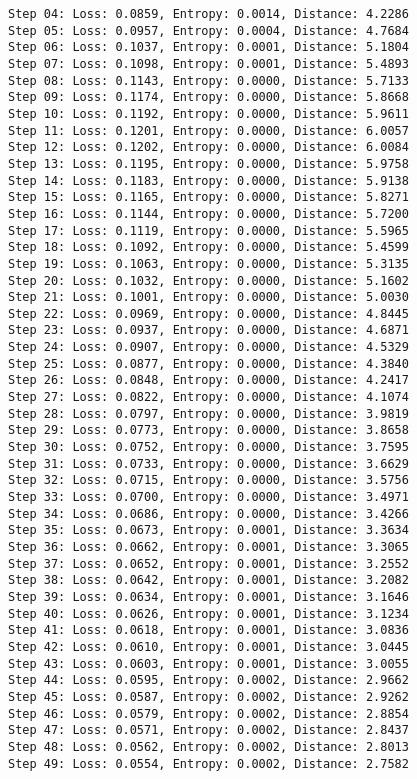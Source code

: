 \documentclass[11pt]{article}
\begin{document}
\begin{Verbatim}[commandchars=\\\{\}]
Step 04: Loss: 0.0859, Entropy: 0.0014, Distance: 4.2286
Step 05: Loss: 0.0957, Entropy: 0.0004, Distance: 4.7684
Step 06: Loss: 0.1037, Entropy: 0.0001, Distance: 5.1804
Step 07: Loss: 0.1098, Entropy: 0.0001, Distance: 5.4893
Step 08: Loss: 0.1143, Entropy: 0.0000, Distance: 5.7133
Step 09: Loss: 0.1174, Entropy: 0.0000, Distance: 5.8668
Step 10: Loss: 0.1192, Entropy: 0.0000, Distance: 5.9611
Step 11: Loss: 0.1201, Entropy: 0.0000, Distance: 6.0057
Step 12: Loss: 0.1202, Entropy: 0.0000, Distance: 6.0084
Step 13: Loss: 0.1195, Entropy: 0.0000, Distance: 5.9758
Step 14: Loss: 0.1183, Entropy: 0.0000, Distance: 5.9138
Step 15: Loss: 0.1165, Entropy: 0.0000, Distance: 5.8271
Step 16: Loss: 0.1144, Entropy: 0.0000, Distance: 5.7200
Step 17: Loss: 0.1119, Entropy: 0.0000, Distance: 5.5965
Step 18: Loss: 0.1092, Entropy: 0.0000, Distance: 5.4599
Step 19: Loss: 0.1063, Entropy: 0.0000, Distance: 5.3135
Step 20: Loss: 0.1032, Entropy: 0.0000, Distance: 5.1602
Step 21: Loss: 0.1001, Entropy: 0.0000, Distance: 5.0030
Step 22: Loss: 0.0969, Entropy: 0.0000, Distance: 4.8445
Step 23: Loss: 0.0937, Entropy: 0.0000, Distance: 4.6871
Step 24: Loss: 0.0907, Entropy: 0.0000, Distance: 4.5329
Step 25: Loss: 0.0877, Entropy: 0.0000, Distance: 4.3840
Step 26: Loss: 0.0848, Entropy: 0.0000, Distance: 4.2417
Step 27: Loss: 0.0822, Entropy: 0.0000, Distance: 4.1074
Step 28: Loss: 0.0797, Entropy: 0.0000, Distance: 3.9819
Step 29: Loss: 0.0773, Entropy: 0.0000, Distance: 3.8658
Step 30: Loss: 0.0752, Entropy: 0.0000, Distance: 3.7595
Step 31: Loss: 0.0733, Entropy: 0.0000, Distance: 3.6629
Step 32: Loss: 0.0715, Entropy: 0.0000, Distance: 3.5756
Step 33: Loss: 0.0700, Entropy: 0.0000, Distance: 3.4971
Step 34: Loss: 0.0686, Entropy: 0.0000, Distance: 3.4266
Step 35: Loss: 0.0673, Entropy: 0.0001, Distance: 3.3634
Step 36: Loss: 0.0662, Entropy: 0.0001, Distance: 3.3065
Step 37: Loss: 0.0652, Entropy: 0.0001, Distance: 3.2552
Step 38: Loss: 0.0642, Entropy: 0.0001, Distance: 3.2082
Step 39: Loss: 0.0634, Entropy: 0.0001, Distance: 3.1646
Step 40: Loss: 0.0626, Entropy: 0.0001, Distance: 3.1234
Step 41: Loss: 0.0618, Entropy: 0.0001, Distance: 3.0836
Step 42: Loss: 0.0610, Entropy: 0.0001, Distance: 3.0445
Step 43: Loss: 0.0603, Entropy: 0.0001, Distance: 3.0055
Step 44: Loss: 0.0595, Entropy: 0.0002, Distance: 2.9662
Step 45: Loss: 0.0587, Entropy: 0.0002, Distance: 2.9262
Step 46: Loss: 0.0579, Entropy: 0.0002, Distance: 2.8854
Step 47: Loss: 0.0571, Entropy: 0.0002, Distance: 2.8437
Step 48: Loss: 0.0562, Entropy: 0.0002, Distance: 2.8013
Step 49: Loss: 0.0554, Entropy: 0.0002, Distance: 2.7582

\end{Verbatim}
\end{document}

